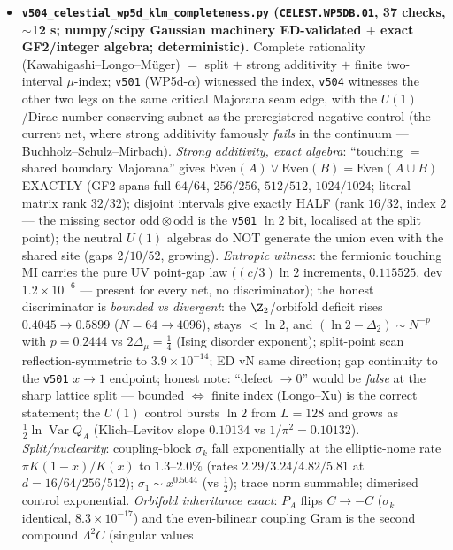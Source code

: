 \documentclass[11pt]{article}
\begin{document}
\begin{itemize}[leftmargin=1.5em]
\item \textbf{\texttt{v504\_celestial\_wp5d\_klm\_completeness.py} (\texttt{CELEST.WP5DB.01}, 37
checks, $\sim$12 s; numpy/scipy Gaussian machinery ED-validated $+$ exact GF2/integer algebra;
deterministic).} Complete rationality (Kawahigashi--Longo--M\"uger) $=$ split $+$ strong additivity
$+$ finite two-interval $\mu$-index; \texttt{v501} (WP5d-$\alpha$) witnessed the index, \texttt{v504}
witnesses the other two legs on the same critical Majorana seam edge, with the $U(1)$/Dirac
number-conserving subnet as the preregistered negative control (the current net, where strong
additivity famously \emph{fails} in the continuum --- Buchholz--Schulz--Mirbach). \emph{Strong
additivity, exact algebra}: ``touching $=$ shared boundary Majorana'' gives
$\mathrm{Even}(A)\vee\mathrm{Even}(B)=\mathrm{Even}(A\cup B)$ EXACTLY (GF2 spans full $64/64$,
$256/256$, $512/512$, $1024/1024$; literal matrix rank $32/32$); disjoint intervals give exactly
HALF (rank $16/32$, index $2$ --- the missing sector $\mathrm{odd}\otimes\mathrm{odd}$ is the
\texttt{v501} $\ln2$ bit, localised at the split point); the neutral $U(1)$ algebras do NOT generate
the union even with the shared site (gaps $2/10/52$, growing). \emph{Entropic witness}: the
fermionic touching MI carries the pure UV point-gap law ($(c/3)\ln2$ increments, $0.115525$, dev
$1.2\times10^{-6}$ --- present for every net, no discriminator); the honest discriminator is
\emph{bounded vs divergent}: the $\Z_2$/orbifold deficit rises $0.4045\to0.5899$ ($N=64\to4096$),
stays $<\ln2$, and $(\ln2-\Delta_2)\sim N^{-p}$ with $p=0.2444$ vs $2\Delta_\mu=\tfrac14$ (Ising
disorder exponent); split-point scan reflection-symmetric to $3.9\times10^{-14}$; ED vN same
direction; gap continuity to the \texttt{v501} $x\to1$ endpoint; honest note: ``defect $\to0$''
would be \emph{false} at the sharp lattice split --- bounded $\Leftrightarrow$ finite index
(Longo--Xu) is the correct statement; the $U(1)$ control bursts $\ln2$ from $L=128$ and grows as
$\tfrac12\ln\operatorname{Var}Q_A$ (Klich--Levitov slope $0.10134$ vs $1/\pi^2=0.10132$).
\emph{Split/nuclearity}: coupling-block $\sigma_k$ fall exponentially at the elliptic-nome rate
$\pi K(1-x)/K(x)$ to $1.3$--$2.0\%$ (rates $2.29/3.24/4.82/5.81$ at $d=16/64/256/512$);
$\sigma_1\sim x^{0.5044}$ (vs $\tfrac12$); trace norm summable; dimerised control exponential.
\emph{Orbifold inheritance exact}: $P_A$ flips $C\to-C$ ($\sigma_k$ identical, $8.3\times10^{-17}$)
and the even-bilinear coupling Gram is the second compound $\Lambda^2C$ (singular values

\end{itemize}
\end{document}

